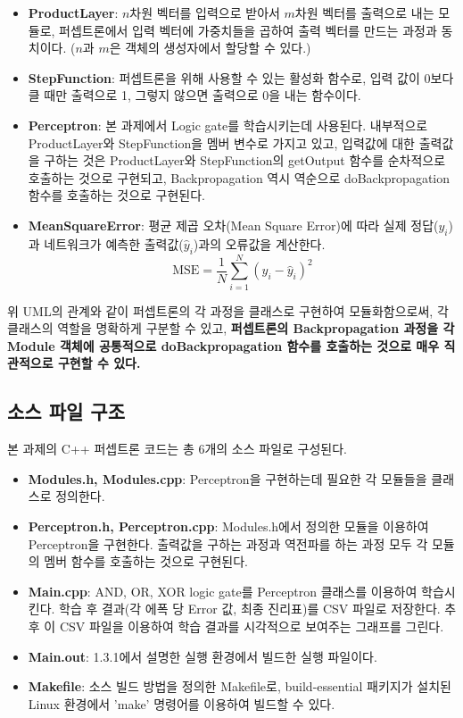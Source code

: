 \documentclass[letterpaper,10pt]{article}
\begin{document}
		\begin{itemize}
			\item \textbf{ProductLayer}: $n$차원 벡터를 입력으로 받아서 $m$차원 벡터를 출력으로 내는 모듈로, 퍼셉트론에서 입력 벡터에 가중치들을 곱하여 출력 벡터를 만드는 과정과 동치이다. ($n$과 $m$은 객체의 생성자에서 할당할 수 있다.)
			\item \textbf{StepFunction}: 퍼셉트론을 위해 사용할 수 있는 활성화 함수로, 입력 값이 0보다 클 때만 출력으로 1, 그렇지 않으면 출력으로 0을 내는 함수이다.
			\item \textbf{Perceptron}: 본 과제에서 Logic gate를 학습시키는데 사용된다. 내부적으로 ProductLayer와 StepFunction을 멤버 변수로 가지고 있고, 입력값에 대한 출력값을 구하는 것은 ProductLayer와 StepFunction의 getOutput 함수를 순차적으로 호출하는 것으로 구현되고, Backpropagation 역시 역순으로 doBackpropagation 함수를 호출하는 것으로 구현된다.
			\item \textbf{MeanSquareError}: 평균 제곱 오차(Mean Square Error)에 따라 실제 정답($y_i$)과 네트워크가 예측한 출력값($\hat{y}_i$)과의 오류값을 계산한다.\\
			\[
			\text{MSE}=\frac{1}{N}\sum_{i=1}^{N} (y_i-\hat{y}_i)^2
			\]
		\end{itemize}
		
		위 UML의 관계와 같이 퍼셉트론의 각 과정을 클래스로 구현하여 모듈화함으로써, 각 클래스의 역할을 명확하게 구분할 수 있고, \textbf{퍼셉트론의 Backpropagation 과정을 각 Module 객체에 공통적으로 doBackpropagation 함수를 호출하는 것으로 매우 직관적으로 구현할 수 있다.}
	
	\subsection{소스 파일 구조}
	
		본 과제의 C++ 퍼셉트론 코드는 총 6개의 소스 파일로 구성된다.
		
		\begin{itemize}
			\item \textbf{Modules.h, Modules.cpp}: Perceptron을 구현하는데 필요한 각 모듈들을 클래스로 정의한다.
			\item \textbf{Perceptron.h, Perceptron.cpp}: Modules.h에서 정의한 모듈을 이용하여 Perceptron을 구현한다. 출력값을 구하는 과정과 역전파를 하는 과정 모두 각 모듈의 멤버 함수를 호출하는 것으로 구현된다.
			\item \textbf{Main.cpp}: AND, OR, XOR logic gate를 Perceptron 클래스를 이용하여 학습시킨다. 학습 후 결과(각 에폭 당 Error 값, 최종 진리표)를 CSV 파일로 저장한다. 추후 이 CSV 파일을 이용하여 학습 결과를 시각적으로 보여주는 그래프를 그린다.
			\item \textbf{Main.out}: 1.3.1에서 설명한 실행 환경에서 빌드한 실행 파일이다.
			\item \textbf{Makefile}: 소스 빌드 방법을 정의한 Makefile로, build-essential 패키지가 설치된 Linux 환경에서 ’make’ 명령어를 이용하여 빌드할 수 있다.
		\end{itemize}
	
\end{document}
